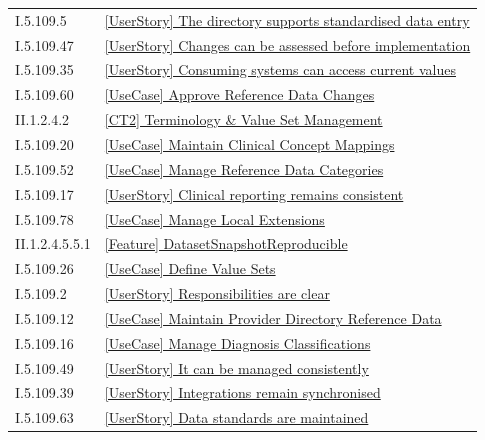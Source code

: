 \begin{longtable}{p{.22\linewidth}p{.73\linewidth}}
I.5.109.5 & \hyperref[element:19f93909acab4bf2a2d3792b36d3296c]{[UserStory] The directory supports standardised data entry} \\
I.5.109.47 & \hyperref[element:1a5e811fbe2e4d3395a0bc06df3a3378]{[UserStory] Changes can be assessed before implementation} \\
I.5.109.35 & \hyperref[element:1aceb8b4a2104ab8aaf7c0da35d51325]{[UserStory] Consuming systems can access current values} \\
I.5.109.60 & \hyperref[element:1c2bfb944c0a4129aa5a9b9d8502be6a]{[UseCase] Approve Reference Data Changes} \\
II.1.2.4.2 & \hyperref[element:206b3d64a5b14e9a99974851c8be45df]{[CT2] Terminology \& Value Set Management} \\
I.5.109.20 & \hyperref[element:22b4b45a798a4b4f8119230feaab49e2]{[UseCase] Maintain Clinical Concept Mappings} \\
I.5.109.52 & \hyperref[element:240245fafad04198af002594c2e8478e]{[UseCase] Manage Reference Data Categories} \\
I.5.109.17 & \hyperref[element:27ea9a200a2242c6ba600a6f8c0cb4cc]{[UserStory] Clinical reporting remains consistent} \\
I.5.109.78 & \hyperref[element:2938f2379f5242c382763269229eb94b]{[UseCase] Manage Local Extensions} \\
II.1.2.4.5.5.1 & \hyperref[element:2ae0e5afc0f8466390b64f962c0b1e2d]{[Feature] DatasetSnapshotReproducible} \\
I.5.109.26 & \hyperref[element:2bba58bed9e547fd9a610d9a99b8f020]{[UseCase] Define Value Sets} \\
I.5.109.2 & \hyperref[element:2e24acb8ba2f4b32ade1f264dd6f1fff]{[UserStory] Responsibilities are clear} \\
I.5.109.12 & \hyperref[element:347ac39b2a074e55926bba1c62f05a22]{[UseCase] Maintain Provider Directory Reference Data} \\
I.5.109.16 & \hyperref[element:3b85423808fb4c74aa7e98363b82deef]{[UseCase] Manage Diagnosis Classifications} \\
I.5.109.49 & \hyperref[element:3dce993946a043cea447447b3d46724f]{[UserStory] It can be managed consistently} \\
I.5.109.39 & \hyperref[element:3fef6f8b4ca24844a01b3cb4344b6e59]{[UserStory] Integrations remain synchronised} \\
I.5.109.63 & \hyperref[element:4754e52ae7a44e549413c0ba20fbc2ef]{[UserStory] Data standards are maintained} \\

\end{longtable}

